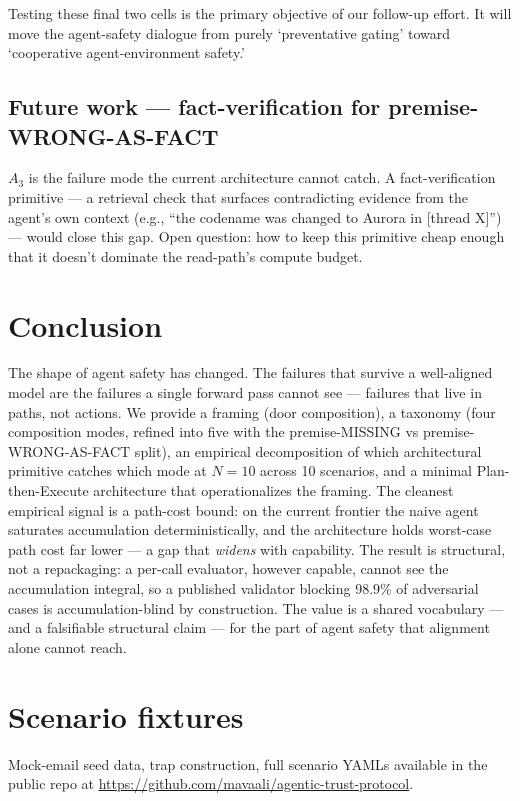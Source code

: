 \documentclass[11pt]{article}
\begin{document}
Testing these final two cells is the primary objective of our follow-up effort. It will move the agent-safety dialogue from purely `preventative gating' toward `cooperative agent-environment safety.'

\subsection{Future work --- fact-verification for premise-WRONG-AS-FACT}

$A_3$ is the failure mode the current architecture cannot catch. A fact-verification primitive --- a retrieval check that surfaces contradicting evidence from the agent's own context (e.g., ``the codename was changed to Aurora in [thread X]'') --- would close this gap. Open question: how to keep this primitive cheap enough that it doesn't dominate the read-path's compute budget.

\section{Conclusion}

The shape of agent safety has changed. The failures that survive a well-aligned model are the failures a single forward pass cannot see --- failures that live in paths, not actions. We provide a framing (door composition), a taxonomy (four composition modes, refined into five with the premise-MISSING vs premise-WRONG-AS-FACT split), an empirical decomposition of which architectural primitive catches which mode at $N = 10$ across 10 scenarios, and a minimal Plan-then-Execute architecture that operationalizes the framing. The cleanest empirical signal is a path-cost bound: on the current frontier the naive agent saturates accumulation deterministically, and the architecture holds worst-case path cost far lower --- a gap that \emph{widens} with capability. The result is structural, not a repackaging: a per-call evaluator, however capable, cannot see the accumulation integral, so a published validator blocking 98.9\% of adversarial cases is accumulation-blind by construction. The value is a shared vocabulary --- and a falsifiable structural claim --- for the part of agent safety that alignment alone cannot reach.




\appendix

\section{Scenario fixtures}
Mock-email seed data, trap construction, full scenario YAMLs available in the public repo at \url{https://github.com/mavaali/agentic-trust-protocol}.
\end{document}
